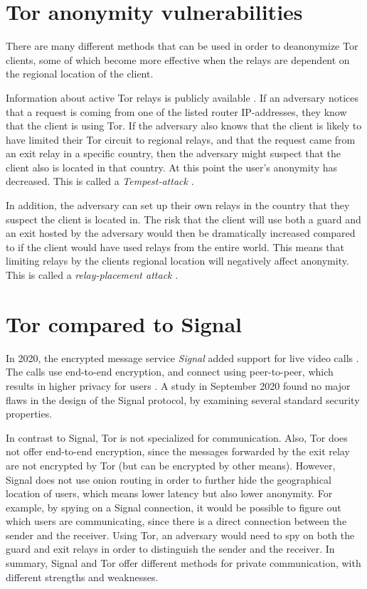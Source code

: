 \documentclass{kththesis}
\begin{document}
\section{Tor anonymity vulnerabilities}
There are many different methods that can be used in order to deanonymize Tor clients, some of which become more effective when the relays are dependent on the regional location of the client. 

Information about active Tor relays is publicly available \parencite{TorRelaySearch}. If an adversary notices that a request is coming from one of the listed router IP-addresses, they know that the client is using Tor. If the adversary also knows that the client is likely to have limited their Tor circuit to regional relays, and that the request came from an exit relay in a specific country, then the adversary might suspect that the client also is located in that country. At this point the user's anonymity has decreased. This is called a \emph{Tempest-attack} \parencite{wails2018tempest}\parencite{CLAPS}.

In addition, the adversary can set up their own relays in the country that they suspect the client is located in. The risk that the client will use both a guard and an exit hosted by the adversary would then be dramatically increased compared to if the client would have used relays from the entire world. This means that limiting relays by the clients regional location will negatively affect anonymity. This is called a \emph{relay-placement attack} \parencite{guardPlacementAttacks}\parencite{CLAPS}.

\section{Tor compared to Signal}
In 2020, the encrypted message service \emph{Signal} added support for live video calls \parencite{signal}. The calls use end-to-end encryption, and connect using peer-to-peer, which results in higher privacy for users \parencite{signalPeerToPeer}. A study \parencite{cohn2020formalsecurity} in September 2020 found no major flaws in the design of the Signal protocol, by examining several standard security properties. 

In contrast to Signal, Tor is not specialized for communication. Also, Tor does not offer end-to-end encryption, since the messages forwarded by the exit relay are not encrypted by Tor (but can be encrypted by other means). However, Signal does not use onion routing in order to further hide the geographical location of users, which means lower latency but also lower anonymity. For example, by spying on a Signal connection, it would be possible to figure out which users are communicating, since there is a direct connection between the sender and the receiver. Using Tor, an adversary would need to spy on both the guard and exit relays in order to distinguish the sender and the receiver. In summary, Signal and Tor offer different methods for private communication, with different strengths and weaknesses.
\end{document}
